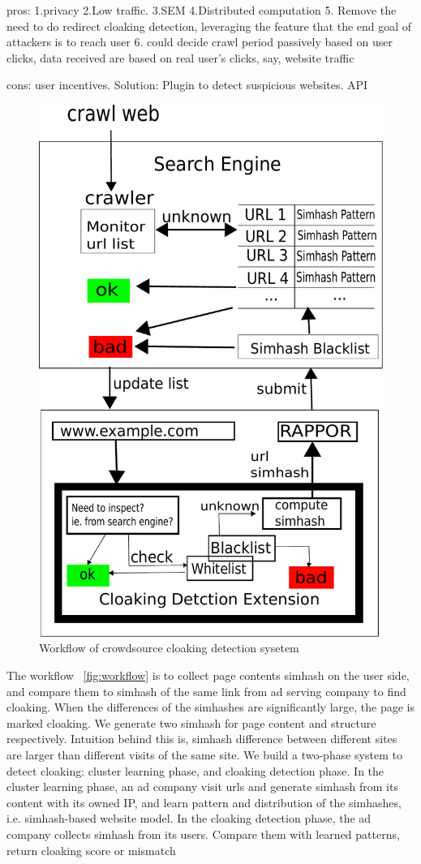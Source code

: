 pros: 	1.privacy 2.Low traffic. 3.SEM 4.Distributed computation 
5. Remove the need to do redirect cloaking detection, leveraging the feature
that the end goal of attackers is to reach user
6. could decide crawl period passively based on user clicks, data received are
based on real user’s clicks, say, website traffic

cons: user incentives. 
Solution: Plugin to detect suspicious websites. API


\begin{figure}[t]
  \centering
  \includegraphics[width=.5\textwidth]{fig/workflow}
  \caption{Workflow of crowdsource cloaking detection sysetem}
  \label{fig:workflow}
\end{figure}


The workflow ~\autoref{fig:workflow} is to collect page contents simhash on the user side, and compare
them to simhash of the same link from ad serving company to find cloaking. When
the differences of the simhashes are significantly large, the page is marked
cloaking. We generate two simhash for page content and structure respectively.
Intuition behind this is, simhash difference between different sites are larger
than different visits of the same site. We build a two-phase system to detect
cloaking: cluster learning phase, and cloaking detection phase. In the cluster
learning phase, an ad company visit urls and generate simhash from its content
with its owned IP, and learn pattern and distribution of the simhashes, i.e.
simhash-based website model. In the cloaking detection phase, the ad company
collects simhash from its users. Compare them with learned patterns, return
cloaking score or mismatch

